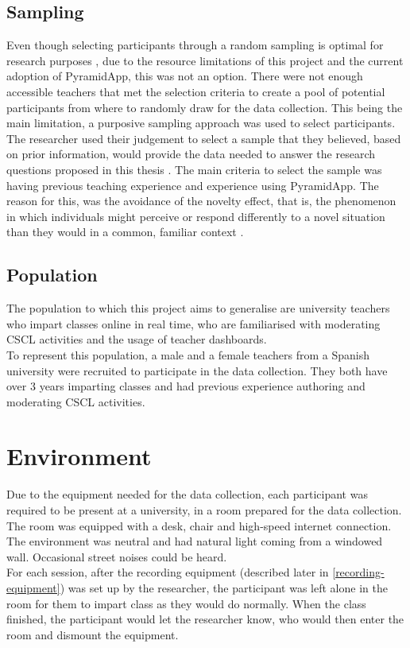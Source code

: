 \subsection{Sampling}
Even though selecting participants through a random sampling is optimal for research purposes \cite{fraenkel_wallen_hyun_2019}, due to the resource limitations of this project and the current adoption of PyramidApp, this was not an option. There were not enough accessible teachers that met the selection criteria to create a pool of potential participants from where to randomly draw for the data collection. This being the main limitation, a purposive sampling approach was used to select participants. The researcher used their judgement to select a sample that they believed, based on prior information, would provide the data needed to answer the research questions proposed in this thesis \cite{fraenkel_wallen_hyun_2019}. The main criteria to select the sample was having previous teaching experience and experience using PyramidApp. The reason for this, was the avoidance of the novelty effect, that is, the phenomenon in which individuals might perceive or respond differently to a novel situation than they would in a common, familiar context \cite{gravetter_2016}.
\subsection{Population}
The population to which this project aims to generalise are university teachers who impart classes online in real time, who are familiarised with moderating CSCL activities and the usage of teacher dashboards. \\To represent this population, a male and a female teachers from a Spanish university were recruited to participate in the data collection. They both have over 3 years imparting classes and had previous experience authoring and moderating CSCL activities.
\section{Environment} \label{environment}
Due to the equipment needed for the data collection, each participant was required to be present at a university, in a room prepared for the data collection. The room was equipped with a desk, chair and high-speed internet connection. The environment was neutral and had natural light coming from a windowed wall. Occasional street noises could be heard.\\ For each session, after the recording equipment (described later in \ref{recording-equipment}) was set up by the researcher, the participant was left alone in the room for them to impart class as they would do normally. When the class finished, the participant would let the researcher know, who would then enter the room and dismount the equipment.
